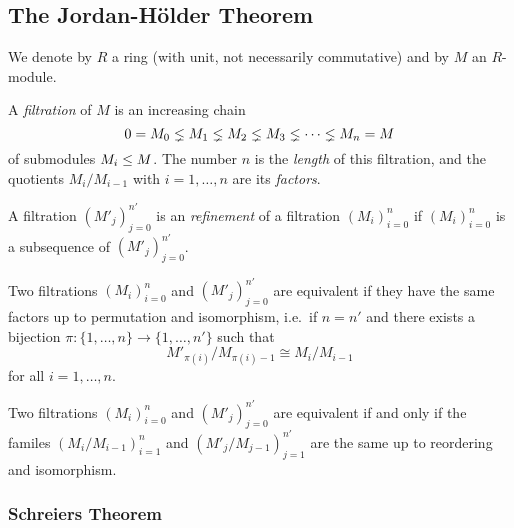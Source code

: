 \subsection{The Jordan-Hölder Theorem}
\label{appendix: jordan hoelder}


\begin{conventions}
  We denote by $R$ a ring (with unit, not necessarily commutative) and by $M$ an $R$-module.
\end{conventions}


\begin{definition}
  \label{definition: filtration}
  A \emph{filtration} of $M$ is an increasing chain
  \[
                0
    =           M_0
    \lneq  M_1
    \lneq  M_2
    \lneq  M_3
    \lneq  \dotsb
    \lneq  M_n
    =           M
  \]
  of submodules $M_i \leq M$.
  The number $n$ is the \emph{length} of this filtration, and the quotients $M_i/M_{i-1}$ with $i = 1, \dotsc, n$ are its \emph{factors}.
\end{definition}


\begin{definition}
  A filtration $(M'_j)_{j=0}^{n'}$ is an \emph{refinement} of a filtration $(M_i)_{i=0}^n$ if $(M_i)_{i=0}^n$ is a subsequence of $(M'_j)_{j=0}^{n'}$.
\end{definition}


\begin{definition}
  Two filtrations $(M_i)_{i=0}^n$ and $(M'_j)_{j=0}^{n'}$ are equivalent if they have the same factors up to permutation and isomorphism, i.e.\ if $n = n'$ and there exists a bijection $\pi \colon \{1, \dotsc, n\} \to \{1, \dotsc, n'\}$ such that
  \[
          M'_{\pi(i)} / M_{\pi(i)-1}
    \cong M_i / M_{i-1}
  \]
  for all $i = 1, \dotsc, n$.
\end{definition}


\begin{remark}
  Two filtrations $(M_i)_{i=0}^n$ and $(M'_j)_{j=0}^{n'}$ are equivalent if and only if the familes $(M_i/M_{i-1})_{i=1}^n$ and $(M'_j/M_{j-1})_{j=1}^{n'}$ are the same up to reordering and isomorphism.
\end{remark}







\subsubsection{Schreiers Theorem}



